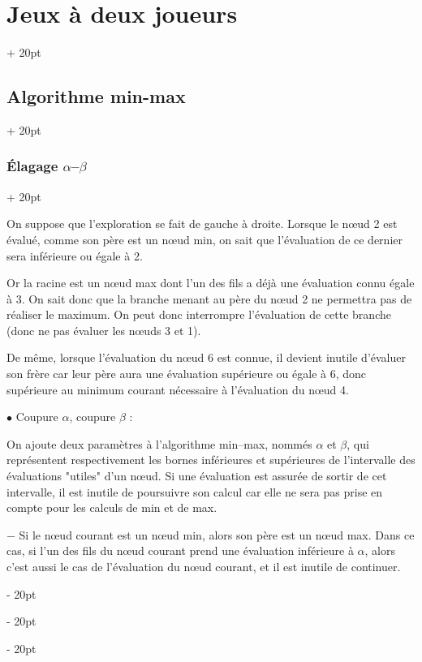 \documentclass[a4paper, 12pt, twoside]{article}
\newcommand{\ind}[1][20pt]{\advance\leftskip + #1}
\newcommand{\deind}[1][20pt]{\advance\leftskip - #1}
\newenvironment{indt}[2][20pt]{#2 \par \ind[#1]}{\par \deind} %
\begin{document}
\begin{indt}{\section{Jeux à deux joueurs}}
\begin{indt}{\subsection{Algorithme min-max}}
\begin{indt}{\subsubsection{\'Elagage $\alpha$--$\beta$}}
\begin{center}
                \end{center}

                On suppose que l'exploration se fait de gauche à droite.
                Lorsque le n\oe ud 2 est évalué, comme son père est un n\oe ud min, on sait que l'évaluation de ce dernier sera inférieure ou égale à 2.

                Or la racine est un n\oe ud max dont l'un des fils a déjà une évaluation connu égale à 3. On sait donc que la branche menant au père du n\oe ud 2 ne permettra pas de réaliser le maximum. On peut donc interrompre l'évaluation de cette branche (donc ne pas évaluer les n\oe uds 3 et 1).

                De même, lorsque l'évaluation du n\oe ud 6 est connue, il devient inutile d'évaluer son frère car leur père aura une évaluation supérieure ou égale à 6, donc supérieure au minimum courant nécessaire à l'évaluation du n\oe ud 4.

                \vspace{12pt}
                
                $\bullet$ Coupure $\alpha$, coupure $\beta$ :

                On ajoute deux paramètres à l'algorithme min--max, nommés $\alpha$ et $\beta$, qui représentent respectivement les bornes inférieures et supérieures de l'intervalle des évaluations "utiles" d'un n\oe ud.
                Si une évaluation est assurée de sortir de cet intervalle, il est inutile de poursuivre son calcul car elle ne sera pas prise en compte pour les calculs de min et de max.

                $-$ Si le n\oe ud courant est un n\oe ud min, alors son père est un n\oe ud max.
                Dans ce cas, si l'un des fils du n\oe ud courant prend une évaluation inférieure à $\alpha$, alors c'est aussi le cas de l'évaluation du n\oe ud courant, et il est inutile de continuer.


\end{indt}
\end{indt}
\end{indt}
\end{document}

